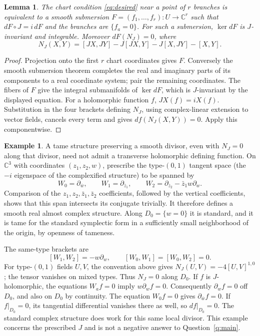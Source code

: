 \documentclass[11pt]{article}
\newtheorem{lemma}[theorem]{Lemma}
\theoremstyle{definition}
\newtheorem{example}[theorem]{Example}
\theoremstyle{remark}
\newcommand{\C}{\mathbb C}
\begin{document}
\begin{lemma}\label{lem:submersion}
The chart condition \eqref{eq:desired} near a point of $r$ branches is equivalent to a smooth submersion $F=(f_1,\ldots,f_r):U\to\C^r$ such that $dF\circ J=i\,dF$ and the branches are $\{f_a=0\}$. For such a submersion, $\ker dF$ is $J$-invariant and integrable. Moreover $dF(N_J)=0$, where
\[
 N_J(X,Y)=[JX,JY]-J[JX,Y]-J[X,JY]-[X,Y].
\]
\end{lemma}
\begin{proof}
Projection onto the first $r$ chart coordinates gives $F$. Conversely the smooth submersion theorem completes the real and imaginary parts of its components to a real coordinate system; pair the remaining coordinates. The fibers of $F$ give the integral submanifolds of $\ker dF$, which is $J$-invariant by the displayed equation.
For a holomorphic function $f$, $JX(f)=iX(f)$. Substitution in the four brackets defining $N_J$, using complex-linear extension to vector fields, cancels every term and gives $df(N_J(X,Y))=0$. Apply this componentwise.
\end{proof}

\begin{example}\label{ex:badJ}
A tame structure preserving a smooth divisor, even with $N_J=0$ along that divisor, need not admit a transverse holomorphic defining function.
On $\C^3$ with coordinates $(z_1,z_2,w)$, prescribe the type-$(0,1)$ tangent space (the $-i$ eigenspace of the complexified structure) to be spanned by
\[
 W_0=\partial_{\bar w},\qquad W_1=\partial_{\bar z_1},\qquad
 W_2=\partial_{\bar z_2}-\bar z_1w\partial_w.
\]
Comparison of the $z_1,z_2,\bar z_1,\bar z_2$ coefficients, followed by the vertical coefficients, shows that this span intersects its conjugate trivially. It therefore defines a smooth real almost complex structure. Along $D_0=\{w=0\}$ it is standard, and it is tame for the standard symplectic form in a sufficiently small neighborhood of the origin, by openness of tameness.

The same-type brackets are
\[
 [W_1,W_2]=-w\partial_w,\qquad [W_0,W_1]=[W_0,W_2]=0.
\]
For type-$(0,1)$ fields $U,V$, the convention above gives
$N_J(U,V)=-4[U,V]^{1,0}$; the tensor vanishes on mixed types. Thus $N_J=0$ along $D_0$. If $f$ is $J$-holomorphic, the equations $W_af=0$ imply $w\partial_wf=0$. Consequently $\partial_wf=0$ off $D_0$, and also on $D_0$ by continuity. The equation $W_0f=0$ gives $\partial_{\bar w}f=0$. If $f|_{D_0}=0$, its tangential differential vanishes there as well, so $df|_{D_0}=0$.
The standard complex structure does work for this same local divisor. This example concerns the prescribed $J$ and is not a negative answer to Question~\ref{q:main}.
\end{example}
\end{document}
